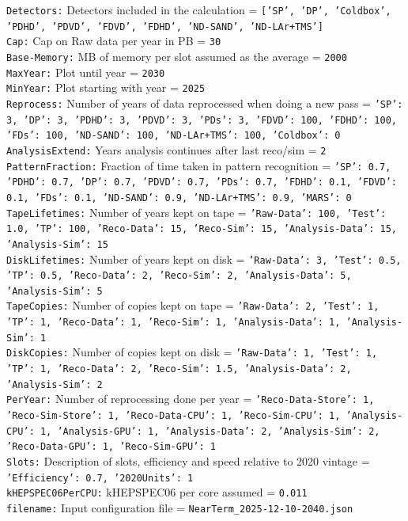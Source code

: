 {\tt Detectors:} Detectors included in the calculation = {\tt ['SP', 'DP', 'Coldbox', 'PDHD', 'PDVD', 'FDVD', 'FDHD', 'ND-SAND', 'ND-LAr+TMS']} \\
{\tt Cap:} Cap on Raw data per year in PB = {\tt 30} \\
{\tt Base-Memory:} MB of memory per slot assumed as the average = {\tt 2000} \\
{\tt MaxYear:} Plot until year = {\tt 2030} \\
{\tt MinYear:} Plot starting with year = {\tt 2025} \\
{\tt Reprocess:} Number of years of data reprocessed when doing a new pass = {\tt {'SP': 3, 'DP': 3, 'PDHD': 3, 'PDVD': 3, 'PDs': 3, 'FDVD': 100, 'FDHD': 100, 'FDs': 100, 'ND-SAND': 100, 'ND-LAr+TMS': 100, 'Coldbox': 0}} \\
{\tt AnalysisExtend:} Years analysis continues after last reco/sim = {\tt 2} \\
{\tt PatternFraction:} Fraction of time taken in pattern recognition = {\tt {'SP': 0.7, 'PDHD': 0.7, 'DP': 0.7, 'PDVD': 0.7, 'PDs': 0.7, 'FDHD': 0.1, 'FDVD': 0.1, 'FDs': 0.1, 'ND-SAND': 0.9, 'ND-LAr+TMS': 0.9, 'MARS': 0}} \\
{\tt TapeLifetimes:} Number of years kept on tape = {\tt {'Raw-Data': 100, 'Test': 1.0, 'TP': 100, 'Reco-Data': 15, 'Reco-Sim': 15, 'Analysis-Data': 15, 'Analysis-Sim': 15}} \\
{\tt DiskLifetimes:} Number of years kept on disk = {\tt {'Raw-Data': 3, 'Test': 0.5, 'TP': 0.5, 'Reco-Data': 2, 'Reco-Sim': 2, 'Analysis-Data': 5, 'Analysis-Sim': 5}} \\
{\tt TapeCopies:} Number of copies kept on tape = {\tt {'Raw-Data': 2, 'Test': 1, 'TP': 1, 'Reco-Data': 1, 'Reco-Sim': 1, 'Analysis-Data': 1, 'Analysis-Sim': 1}} \\
{\tt DiskCopies:} Number of copies kept on disk = {\tt {'Raw-Data': 1, 'Test': 1, 'TP': 1, 'Reco-Data': 2, 'Reco-Sim': 1.5, 'Analysis-Data': 2, 'Analysis-Sim': 2}} \\
{\tt PerYear:} Number of reprocessing done per year = {\tt {'Reco-Data-Store': 1, 'Reco-Sim-Store': 1, 'Reco-Data-CPU': 1, 'Reco-Sim-CPU': 1, 'Analysis-CPU': 1, 'Analysis-GPU': 1, 'Analysis-Data': 2, 'Analysis-Sim': 2, 'Reco-Data-GPU': 1, 'Reco-Sim-GPU': 1}} \\
{\tt Slots:} Description of slots, efficiency and speed relative to 2020 vintage = {\tt {'Efficiency': 0.7, '2020Units': 1}} \\
{\tt kHEPSPEC06PerCPU:} kHEPSPEC06 per core assumed = {\tt 0.011} \\
{\tt filename:} Input configuration file = {\tt NearTerm\_2025-12-10-2040.json} \\
